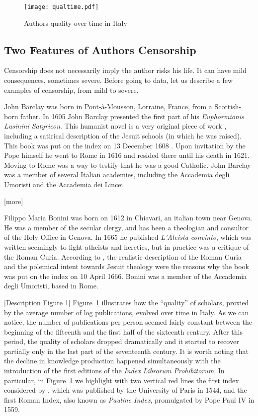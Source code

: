 \documentclass[12pt]{article}
\begin{document}
\begin{figure}[htpb]
\centering
\texttt{[image: qualtime.pdf]}
\caption{Authors quality over time in Italy}\label{fig:qual}
\end{figure}




\subsection{Two Features of Authors Censorship}\label{section:twof}

Censorship does not necessarily imply the author risks his life. It can have mild consequences, sometimes severe. Before going to data, let us describe a few examples of censorship, from mild to severe.

John Barclay was born in Pont-à-Mousson, Lorraine, France, from a Scottish-born father. In 1605 John Barclay presented the first part of his {\em Euphormionis Lusinini Satyricon}. This humanist novel is a very original piece of work \cite{correard17}, including a  satirical  description of the Jesuit schools (in which he was raised). This book was put on the index on 13 December 1608 . Upon invitation by the Pope himself he went to Rome in 1616 and resided there until his death in 1621. Moving to Rome was a way to testify that he was a good Catholic. John Barclay was a member of several Italian academies, including the Accademia degli Umoristi and  the Accademia dei Lincei.

[more]

Filippo Maria Bonini was born on 1612 in Chiavari, an italian town near Genova. He was a member of the secular clergy, and has been a theologian and consultor of the Holy Office in Genova. In 1665 he published {\em L'Ateista convinto}, which was written seemingly to fight atheists and heretics, but in practice was a critique of the Roman Curia. According to , the realistic description of the Roman Curia and the polemical intent towards Jesuit theology were the reasons why the book was put on the index on 10 April 1666. Bonini was a member of the Accademia degli Umoristi, based in Rome.

[Description Figure 1]
Figure~\ref{fig:qual} illustrates how the ``quality'' of scholars, proxied by the average number of log publications, evolved over time in Italy. As we can notice, the number of publications per person seemed fairly constant between the beginning of the fifteenth and the first half of the sixteenth century. After this period, the quality of scholars dropped dramatically and it started to recover partially only in the last part of the seventeenth century. It is worth noting that the decline in knowledge production happened simultaneously with the introduction of the first editions of the {\em Index Librorum Prohibitorum}. In particular, in Figure~\ref{fig:qual} we highlight with two vertical red lines the first index considered by , which was published by the University of Paris in 1544, and the first Roman Index, also known as {\em Pauline Index}, promulgated by Pope Paul IV in 1559.
\end{document}
